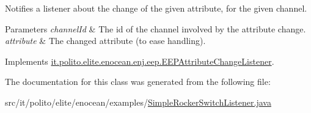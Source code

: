 Notifies a listener about the change of the given attribute, for the given channel. 
\begin{DoxyParams}{Parameters}
{\em channel\+Id} & The id of the channel involved by the attribute change. \\
\hline
{\em attribute} & The changed attribute (to ease handling). \\
\hline
\end{DoxyParams}


Implements \hyperlink{interfaceit_1_1polito_1_1elite_1_1enocean_1_1enj_1_1eep_1_1_e_e_p_attribute_change_listener_a8ed543f4de048252dfd133116d488382}{it.\+polito.\+elite.\+enocean.\+enj.\+eep.\+E\+E\+P\+Attribute\+Change\+Listener}.



The documentation for this class was generated from the following file\+:\begin{DoxyCompactItemize}
\item 
src/it/polito/elite/enocean/examples/\hyperlink{_simple_rocker_switch_listener_8java}{Simple\+Rocker\+Switch\+Listener.\+java}\end{DoxyCompactItemize}
